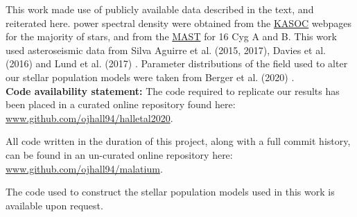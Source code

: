 This work made use of publicly available data described in the text, and reiterated here. \kepler power spectral density  were obtained from the \href{http://kasoc.phys.au.dk/}{KASOC} webpages for the majority of stars, and from the \href{https://archive.
		stsci.edu/prepds/kepseismic/}{MAST} for 16 Cyg A and B. This work used asteroseismic data from Silva Aguirre et al. (2015, 2017), Davies et al. (2016) and Lund et al. (2017) \cite{m_silvaaguirre+2015, m_silvaaguirre+2017,m_davies+2016, m_lund+2017}. Parameter distributions of the \kepler field used to alter our stellar population models were taken from Berger et al. (2020) \cite{m_berger+2020}.\\
	
\textbf{Code availability statement:} The code required to replicate our results has been placed in a curated online repository found here: \url{www.github.com/ojhall94/halletal2020}. 

All code written in the duration of this project, along with a full commit history, can be found in an un-curated online repository here: \url{www.github.com/ojhall94/malatium}. 

The code used to construct the stellar population models used in this work is available upon request.



%